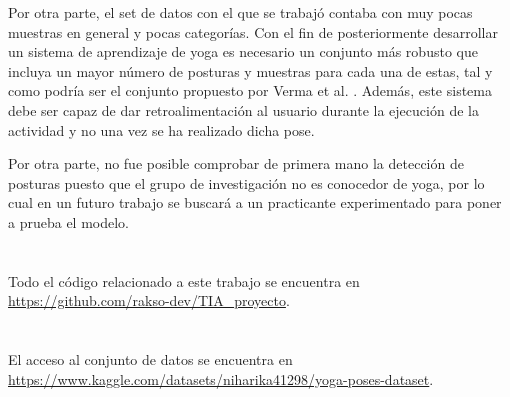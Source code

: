 \documentclass[journal]{IEEEtran}
\begin{document}
Por otra parte, el set de datos con el que se trabajó contaba con muy pocas muestras en general y pocas categorías. Con el fin de posteriormente desarrollar un sistema de aprendizaje de yoga es necesario un conjunto más robusto que incluya un mayor número de posturas y muestras para cada una de estas, tal y como podría ser el conjunto propuesto por Verma et al. \cite{9151085}. Además, este sistema debe ser capaz de dar retroalimentación al usuario durante la ejecución de la actividad y no una vez se ha realizado dicha pose. 

Por otra parte, no fue posible comprobar de primera mano la detección de posturas puesto que el grupo de investigación no es conocedor de yoga, por lo cual en un futuro trabajo se buscará a un practicante experimentado para poner a prueba el modelo.

\appendices
\section{}
Todo el código relacionado a este trabajo se encuentra en \url{https://github.com/rakso-dev/TIA_proyecto}.

\section{}
El acceso al conjunto de datos se encuentra en \url{https://www.kaggle.com/datasets/niharika41298/yoga-poses-dataset}.
\ifCLASSOPTIONcaptionsoff
  \newpage
\fi



\end{document}
